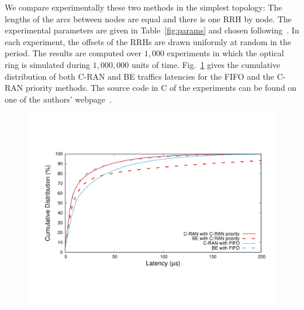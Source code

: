 \documentclass[10pt, conference, letterpaper]{IEEEtran}
\begin{document}
We compare experimentally these two methods in the simplest topology: The lengths of the arcs between nodes are equal and there is one RRH by node. The experimental parameters are given in Table~\ref{fig:params} and chosen following~\cite{ngreenarchitecture}. In each experiment, the offsets of the RRHs are drawn uniformly at random in the period. The results are computed over $1,000$ experiments in which the optical ring is simulated during $1,000,000$ units of time. Fig.~\ref{fig:resultopport} gives the cumulative distribution of both C-RAN and BE traffics latencies for the FIFO and the C-RAN priority methods. The source code in C of the experiments can be found on one of the authors' webpage~\cite{webpage}.
   \vspace{-1.3cm}
   \begin{figure}[h]
        \begin{center}
      \includegraphics[scale=0.3]{opport.pdf}
         \vspace{-1cm}
         \label{fig:resultopport}
  
\end{center} 
\end{figure}
   \vspace{-1cm}
\end{document}
